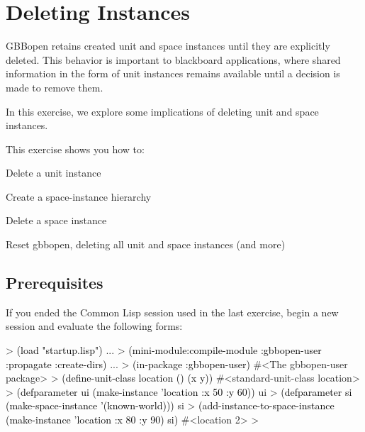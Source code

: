 \documentclass[10pt,twoside,english,pdftex]{article}
\begin{document}
\T\markright{}%
\T\pagestyle{plain}
\T\cleardoublepage
\W{}
\T\pagestyle{fancy}
\T\thispagestyle{fancybottom}
\T\renewcommand{\headrulewidth}{0pt}
\section{Deleting Instances}
\label{sec:deleting-instance}%

GBBopen retains created unit and space instances until they are explicitly
deleted.  This behavior is important to blackboard applications, where shared
information in the form of unit instances remains available until a decision
is made to remove them.

In this exercise, we explore some implications of deleting unit and space
instances.

\fndocrule

This exercise shows you how to:
\begin{tightitemize}
\item Delete a unit instance
\item Create a space-instance hierarchy
\item Delete a space instance
\item Reset gbbopen, deleting all unit and space instances (and more)
\end{tightitemize}

\fndocrule

\subsection*{Prerequisites}

%
%
%
If you ended the Common Lisp session used in the last exercise, begin a new
session and evaluate the following forms:
%
\begin{example}\color{darkergray}%
  > \textcolor{black}{(load "startup.lisp")}
     ...
  > \textcolor{black}{(mini-module:compile-module :gbbopen-user :propagate :create-dirs)}
     ...
  > \textcolor{black}{(in-package :gbbopen-user)}
  #<The gbbopen-user package>
  > \textcolor{black}{(define-unit-class location ()
      (x y))}
  #<standard-unit-class location>
  > \textcolor{black}{(defparameter ui (make-instance 'location :x 50 :y 60))}
  ui
  > \textcolor{black}{(defparameter si (make-space-instance '(known-world)))}
  si
  > \textcolor{black}{(add-instance-to-space-instance 
       (make-instance 'location :x 80 :y 90)
       si)}
  #<location 2>
  >
\end{example}
\end{document}
